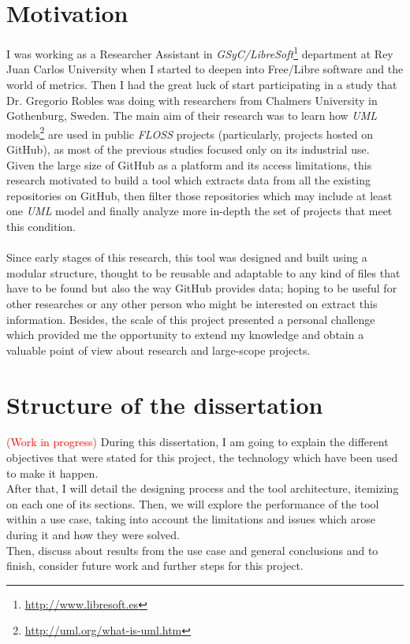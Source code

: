 \documentclass[a4paper, 12pt]{book}
\begin{document}
\section{Motivation}
\label{sec:motivation}
I was working as a Researcher Assistant in \emph{GSyC/LibreSoft}\footnote{\url{http://www.libresoft.es}} department at Rey Juan Carlos University when I started to
deepen into Free/Libre software and the world of metrics. Then I had the great luck of start participating in a study that
Dr. Gregorio Robles was doing with researchers from Chalmers University in Gothenburg, Sweden. The main aim of their research was to
learn how \emph{UML} models\footnote{\url{http://uml.org/what-is-uml.htm}} are used in public \emph{FLOSS} projects (particularly, projects hosted on GitHub),
as most of the previous studies focused only on its industrial use.\\
Given the large size of GitHub as a platform and its access limitations, this research motivated to build a tool which extracts
data from all the existing repositories on GitHub, then filter those repositories which may include at least one
\emph{UML} model and finally analyze more in-depth the set of projects that meet this condition.\\\\
Since early stages of this research, this tool was designed and built using a modular structure, thought to be reusable
and adaptable to any kind of files that have to be found but also the way GitHub provides data; hoping to be useful
for other researches or any other person who might be interested on extract this information. Besides, the scale of this project
presented a personal challenge which provided me the opportunity to extend my knowledge and obtain a valuable point of
view about research and large-scope projects.
\section{Structure of the dissertation}
\label{sec:structure}
\textcolor{red}{(Work in progress)}\newline
During this dissertation, I am going to explain the different objectives that were stated for this project, the technology
which have been used to make it happen.\\
After that, I will detail the designing process and the tool architecture, itemizing on each one of its sections. Then,
we will explore the performance of the tool within a use case, taking into account the limitations and issues which arose
during it and how they were solved.\\Then, discuss about results from the use case and general conclusions
and to finish, consider future work and further steps for this project.
\cleardoublepage
\end{document}
